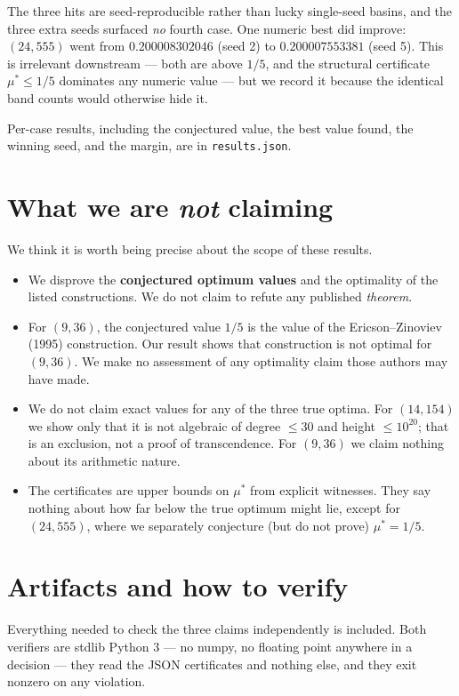 \documentclass[11pt,a4paper]{article}
\newcommand{\mustar}{\mu^{*}}
\begin{document}
\noindent
The three hits are seed-reproducible rather than lucky single-seed basins, and the
three extra seeds surfaced \emph{no} fourth case. One numeric best did improve:
$(24,555)$ went from $0.200008302046$ (seed 2) to $0.200007553381$ (seed 5). This is
irrelevant downstream --- both are above $1/5$, and the structural certificate
$\mustar \le 1/5$ dominates any numeric value --- but we record it because the
identical band counts would otherwise hide it.

Per-case results, including the conjectured value, the best value found, the winning
seed, and the margin, are in \texttt{results.json}.

\section{What we are \emph{not} claiming}

We think it is worth being precise about the scope of these results.

\begin{itemize}
\item We disprove the \textbf{conjectured optimum values} and the optimality of the
listed constructions. We do not claim to refute any published \emph{theorem}.
\item For $(9,36)$, the conjectured value $1/5$ is the value of the Ericson--Zinoviev
(1995) construction. Our result shows that construction is not optimal for $(9,36)$.
We make no assessment of any optimality claim those authors may have made.
\item We do not claim exact values for any of the three true optima. For $(14,154)$ we
show only that it is not algebraic of degree $\le 30$ and height $\le 10^{20}$; that is
an exclusion, not a proof of transcendence. For $(9,36)$ we claim nothing about its
arithmetic nature.
\item The certificates are upper bounds on $\mustar$ from explicit witnesses. They say
nothing about how far below the true optimum might lie, except for $(24,555)$, where
we separately conjecture (but do not prove) $\mustar = 1/5$.
\end{itemize}

\section{Artifacts and how to verify}

Everything needed to check the three claims independently is included. Both verifiers
are stdlib Python 3 --- no numpy, no floating point anywhere in a decision --- they read
the JSON certificates and nothing else, and they exit nonzero on any violation.
\end{document}
